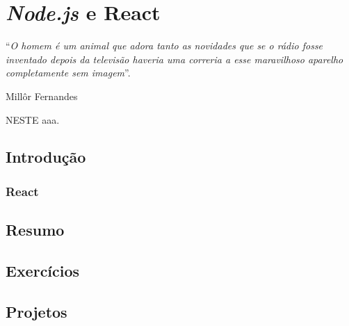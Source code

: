 \chapter{\textit{Node.js} e React}\label{cap:nodeJsReact}
\epigraph{``\textit{O homem é um animal que adora tanto as novidades que se o rádio fosse inventado depois da televisão haveria uma correria a esse maravilhoso aparelho completamente sem imagem}''.}{Millôr Fernandes}

\lettrine[lines=4, lhang=0.1, lraise=0, loversize=0.2, findent=0.1em]{\textcolor{corTema}{N}}{ESTE} aaa.

\vfill

\section{Introdução}



\subsection{React}

\section{Resumo}

\section{Exercícios}

\section{Projetos}